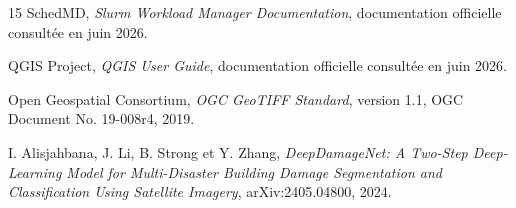 \documentclass[french,12pt]{article}
\begin{document}
\begin{thebibliography}{15}
SchedMD,
\textit{Slurm Workload Manager Documentation},
documentation officielle consultée en juin 2026.

QGIS Project,
\textit{QGIS User Guide},
documentation officielle consultée en juin 2026.

Open Geospatial Consortium,
\textit{OGC GeoTIFF Standard},
version 1.1, OGC Document No. 19-008r4, 2019.

I. Alisjahbana, J. Li, B. Strong et Y. Zhang,
\textit{DeepDamageNet: A Two-Step Deep-Learning Model for Multi-Disaster Building Damage Segmentation and Classification Using Satellite Imagery},
arXiv:2405.04800, 2024.

\end{thebibliography}
\end{document}
